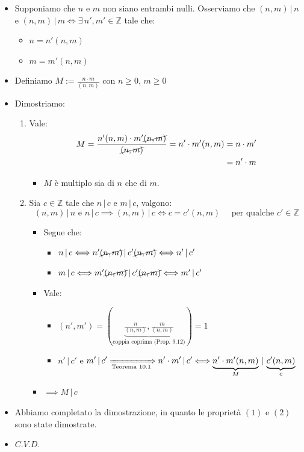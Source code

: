 \documentclass[10pt]{article}
\begin{document}
\begin{itemize}
\item
Supponiamo che $n$ e $m$ non siano entrambi nulli. Osserviamo che $(n,m)\,|\,n$ e $(n,m)\,|\,m \Longleftrightarrow \exists \, n',m' \in \mathbb{Z}$ tale che:
\begin{itemize}
\item
$n = n' (n,m)$
\item
$m = m' (n,m)$
\end{itemize}
\item
Definiamo $M := \displaystyle{\frac{n \cdot m}{(n,m)}}$ con $n \geq 0$, $m \geq 0$
\item
Dimostriamo:
\begin{enumerate}
\item
Vale:
\begin{equation}
\begin{split}
M = \displaystyle{\frac{n' (n,m) \cdot m' \cancel{(n,m)}}{\cancel{(n,m)}}} = n' \cdot m' (n,m) &= n \cdot m'\\
&= n' \cdot m
\notag
\end{split}
\end{equation}
\begin{itemize}
\item
$M$ è multiplo sia di $n$ che di $m$.
\end{itemize}
\item
Sia $c \in \mathbb{Z}$ tale che $n \,|\, c$ e $m \,|\, c$, valgono: $$(n,m)\,|\, n \textrm{ e } n\,|\,c \implies (n,m)\,|\,c \Longleftrightarrow c = c'(n,m) \quad \textrm{ per qualche } c' \in \mathbb{Z}$$
\begin{itemize}
\item
Segue che:
\begin{itemize}
\item
$n\,|\, c \Longleftrightarrow n' \cancel{(n,m)} \,|\, c' \cancel{(n,m)} \Longleftrightarrow n'\,|\, c'$
\item
$m\,|\, c \Longleftrightarrow m' \cancel{(n,m)} \,|\, c' \cancel{(n,m)} \Longleftrightarrow m'\,|\, c'$
\smallskip\smallskip
\end{itemize}
\item
Vale:
\begin{itemize}
\item
$(n',m') = \displaystyle{\left(\underbrace{\frac{n}{(n,m)}, \frac{m}{(n,m)}}_{\textrm{coppia coprima (Prop. 9.12)}}\right) = 1}$ \smallskip \smallskip \smallskip
\item
$n' \,|\, c'$ e $\displaystyle{m' \,|\, c' \xRightarrow[\text{Teorema 10.1}]{} n' \cdot m' \,|\, c' \Longleftrightarrow \underbrace{n' \cdot m' (n,m)}_{M} \,|\, \underbrace{c'(n,m)}_{c}}$ \smallskip
\end{itemize}
\item
$\implies M \,|\, c$
\end{itemize} 
\end{enumerate}
\item
Abbiamo completato la dimostrazione, in quanto le proprietà $(1)$ e $(2)$ sono state dimostrate.
\item
$C.V.D.$
\end{itemize}
\end{document}
